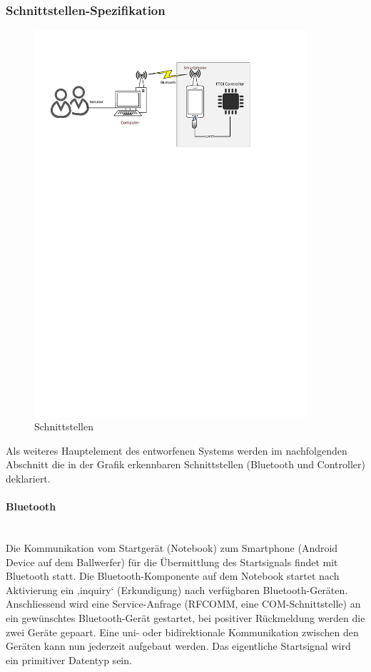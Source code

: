 	\subsubsection{Schnittstellen-Spezifikation}
		\begin{figure}[h!]
			\centering
			\includegraphics[width=0.9\textwidth,clip,trim= 12mm 205mm 43mm 24mm]
			{Enddokumentation/Loesungskonzept/Bilder/Schnittstellen.pdf}
			\caption{Schnittstellen}		
		\end{figure}
		Als weiteres Hauptelement des entworfenen Systems werden im nachfolgenden Abschnitt die in der Grafik erkennbaren Schnittstellen (Bluetooth und Controller) deklariert.
		
		\paragraph{Bluetooth}$~~$\vspace{2mm}\\
		Die Kommunikation vom Startgerät (Notebook) zum Smartphone (Android Device auf dem Ballwerfer) für die Übermittlung des Startsignals findet mit Bluetooth statt. Die Bluetooth-Komponente auf dem Notebook startet nach Aktivierung ein ‚inquiry‘ (Erkundigung) nach verfügbaren Bluetooth-Geräten. Anschliessend wird eine Service-Anfrage (RFCOMM, eine COM-Schnittstelle) an ein gewünschtes Bluetooth-Gerät gestartet, bei positiver Rückmeldung werden die zwei Geräte gepaart. Eine uni- oder bidirektionale Kommunikation zwischen den Geräten kann nun jederzeit aufgebaut werden. Das eigentliche Startsignal wird ein primitiver Datentyp sein.
		
